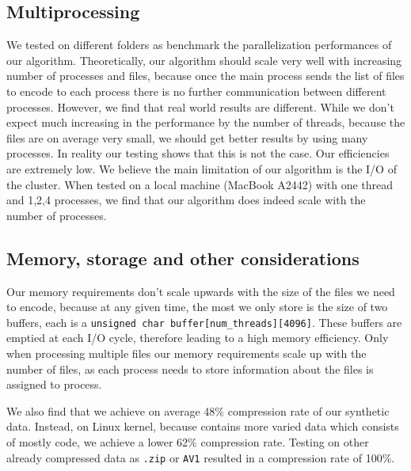 \subsection{Multiprocessing}
We tested on different folders as benchmark the parallelization performances of our algorithm. Theoretically, our algorithm should scale very well with increasing number of processes and files, because once the main process sends the list of files to encode to each process there is no further communication between different processes. However, we find that real world results are different. 
While we don't expect much increasing in the performance by the number of threads, because the files are on average very small, we should get better results by using many processes.
In reality our testing shows that this is not the case. Our efficiencies are extremely low. We believe the main limitation of our algorithm is the I/O of the cluster. When tested on a local machine (MacBook A2442) with one thread and 1,2,4 processes, we find that our algorithm does indeed scale with the number of processes.

\subsection{Memory, storage and other considerations}
Our memory requirements don't scale upwards with the size of the files we need to encode, because at any given time, the most we only store is the size of two buffers, each is a \verb|unsigned char buffer[num_threads][4096]|. These buffers are emptied at each I/O cycle, therefore leading to a high memory efficiency. Only when processing multiple files our memory requirements scale up with the number of files, as each process needs to store information about the files is assigned to process.

We also find that we achieve on average 48\% compression rate of our synthetic data. Instead, on Linux kernel, because contains more varied data which consists of mostly code, we achieve a lower 62\% compression rate. Testing on other already compressed data as \verb|.zip| or \verb|AV1| resulted in a compression rate of 100\%.
